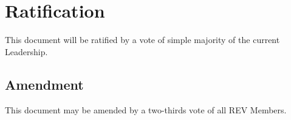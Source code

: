 \section{Ratification}
\label{ratification}

This document will be ratified by a vote of simple majority of the current Leadership.

\subsection{Amendment}
\label{ratification:amendment}

This document may be amended by a two-thirds vote of all REV Members.
